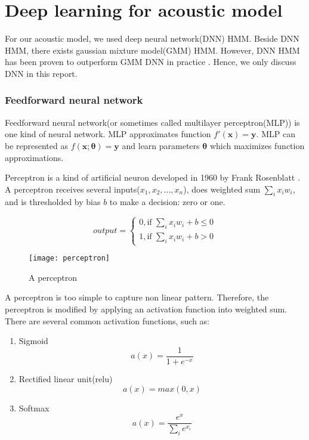 \section{Deep learning for acoustic model}
For our acoustic model, we used deep neural network(DNN) HMM. Beside DNN HMM, there exists gaussian mixture model(GMM) HMM. However, DNN HMM has been proven to outperform GMM DNN in practice \cite{Peddinti2015ATD}. Hence, we only discuss DNN in this report.

\subsubsection{Feedforward neural network}
Feedforward neural network(or sometimes called multilayer perceptron(MLP)) is one kind of neural network. MLP approximates function $f'(\mathbf{x})=\mathbf{y}$. MLP can be represented as $f(\mathbf{x};\mathbf{\theta})=\mathbf{y}$ and learn parameters $\mathbf{\theta}$ which maximizes function approximations. 

Perceptron is a kind of artificial neuron developed in 1960 by Frank Rosenblatt \cite{Rosenblatt1960}. A perceptron receives several inputs($x_{1}, x_{2}, ..., x_{n}$), does weighted sum $\sum_{i} x_{i}w_{i}$, and is thresholded by bias $b$ to make a decision: zero or one.
 
\begin{equation}
output = 
\begin{cases}
0 , \textrm{if } \sum_{i} x_{i}w_{i} + b \leq 0 \\
1, \textrm{if } \sum_{i} x_{i}w_{i} + b > 0
\end{cases}
\end{equation}

\begin{figure}
\label{tdnnArchitecture}
\caption{A perceptron}
\texttt{[image: perceptron]}
\centering
\end{figure}

A perceptron is too simple to capture non linear pattern. Therefore, the perceptron is modified by applying an activation function into weighted sum. There are several common activation functions, such as: 
\begin{enumerate}
\item Sigmoid
\begin{equation}
a(x) = \frac{1}{1 + e ^{-x}}
\end{equation} 

\item Rectified linear unit(relu)
\begin{equation}
a(x) = max(0,x)
\end{equation} 


\item Softmax
\begin{equation}
a(x) = \frac{e^{x}}{\sum_{i} e^{x_{i}}}
\end{equation} 

\end{enumerate}

